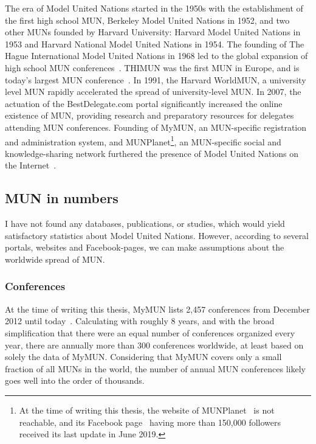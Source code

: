 The era of Model United Nations started in the 1950s with the establishment of the first high school MUN, Berkeley Model United Nations in 1952, and two other MUNs founded by Harvard University: Harvard Model United Nations in 1953 and Harvard National Model United Nations in 1954. The founding of The Hague International Model United Nations in 1968 led to the global expansion of high school MUN conferences~\cite{top10eventsofmun}. THIMUN was the first MUN in Europe, and is today's largest MUN conference~\cite{thimunabout}. In 1991, the Harvard WorldMUN, a university level MUN rapidly accelerated the spread of university-level MUN. In 2007, the actuation of the BestDelegate.com portal significantly increased the online existence of MUN, providing research and preparatory resources for delegates attending MUN conferences. Founding of MyMUN, an MUN-specific registration and administration system, and MUNPlanet\footnote{At the time of writing this thesis, the website of MUNPlanet~\cite{munplanetwebsite} is not reachable, and its Facebook page~\cite{munplanetfacebook} having more than 150,000 followers received its last update in June 2019.}, an MUN-specific social and knowledge-sharing network furthered the presence of Model United Nations on the Internet~\cite{top10eventsofmun}.

\subsection{MUN in numbers}

I have not found any databases, publications, or studies, which would yield satisfactory statistics about Model United Nations. However, according to several portals, websites and Facebook-pages, we can make assumptions about the worldwide spread of MUN.

\subsubsection{Conferences}

At the time of writing this thesis, MyMUN lists 2,457 conferences from December 2012 until today~\cite{mymunconferencelist}. Calculating with roughly 8 years, and with the broad simplification that there were an equal number of conferences organized every year, there are annually more than 300 conferences worldwide, at least based on solely the data of MyMUN. Considering that MyMUN covers only a small fraction of all MUNs in the world, the number of annual MUN conferences likely goes well into the order of thousands.

